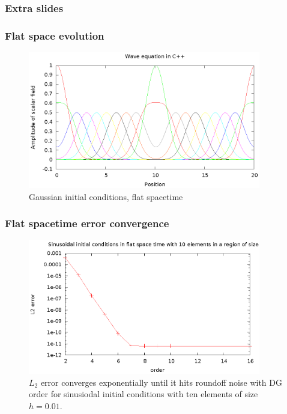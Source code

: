 \documentclass{beamer}
\begin{document}
\begin{frame}
  \frametitle{Extra slides}
\end{frame}

\begin{frame}
  \frametitle{Flat space evolution}
  \begin{figure}
    \includegraphics[width=4.0in]{gaussWave}
    \caption{Gaussian initial conditions, flat spacetime}
  \end{figure}
\end{frame}



\begin{frame}
  \frametitle{Flat spacetime error convergence}
  \begin{figure}
    \includegraphics[width=4.0in]{sinL2WTorder}
    \caption{$L_2$ error converges exponentially until it hits roundoff noise with DG order for sinusiodal initial conditions with ten elements of size $h=0.01$.}
  \end{figure}
\end{frame}
\end{document}

